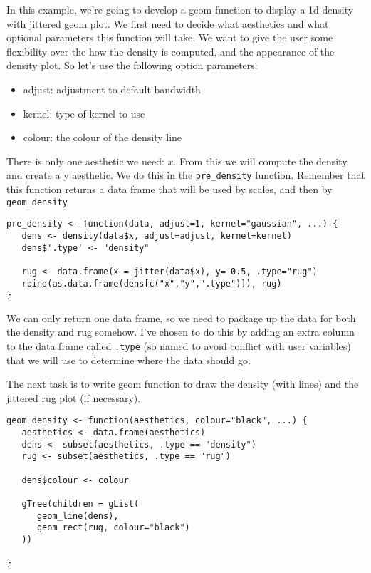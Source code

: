 In this example, we're going to develop a geom function to display a 1d density with jittered geom plot.  We first need to decide what aesthetics and what optional parameters this function will take.  We want to give the user some flexibility over the how the density is computed, and the appearance of the density plot.  So let's use the following option parameters:

\begin{itemize}
	\item adjust: adjustment to default bandwidth
	\item kernel: type of kernel to use
	\item colour: the colour of the density line
\end{itemize}

There is only one aesthetic we need: $x$.  From this we will compute the density and create a y aesthetic.  We do this in the {\tt pre\_density} function.  Remember that this function returns a data frame that will be used by scales, and then by {\tt geom\_density}

\begin{verbatim}
pre_density <- function(data, adjust=1, kernel="gaussian", ...) {
   dens <- density(data$x, adjust=adjust, kernel=kernel)
   dens$'.type' <- "density"

   rug <- data.frame(x = jitter(data$x), y=-0.5, .type="rug")
   rbind(as.data.frame(dens[c("x","y",".type")]), rug)
}
\end{verbatim}

We can only return one data frame, so we need to package up the data for both the density and rug somehow.  I've chosen to do this by adding an extra column to the data frame called {\tt .type} (so named to avoid conflict with user variables) that we will use to determine where the data should go.

The next task is to write geom function to draw the density (with lines) and the jittered rug plot (if necessary).

\begin{verbatim}
geom_density <- function(aesthetics, colour="black", ...) {
   aesthetics <- data.frame(aesthetics)
   dens <- subset(aesthetics, .type == "density")
   rug <- subset(aesthetics, .type == "rug")

   dens$colour <- colour

   gTree(children = gList(
      geom_line(dens),
      geom_rect(rug, colour="black")
   ))

}
\end{verbatim}

